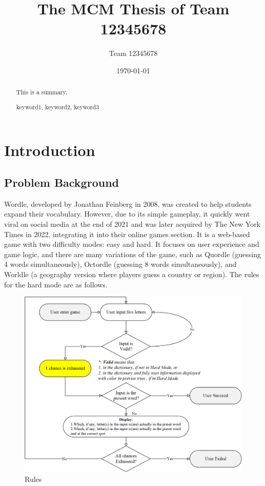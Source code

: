 \documentclass{mcmthesis}  %
\title{The MCM Thesis of Team 12345678}  %
\author{\small Team 12345678}  %
\date{\today}  %
\begin{document}
\begin{abstract}  %
This is a summary.
\begin{keywords}  %
keyword1, keyword2, keyword3
\end{keywords}  %
\end{abstract}  %
\maketitle  %

\tableofcontents  %


\newpage  %
\section{Introduction}  %

\subsection{Problem Background}

Wordle, developed by Jonathan Feinberg in 2008, was created 
to help students expand their vocabulary. However, due to its
simple gameplay, it quickly went viral on social media at the 
end of 2021 and was later acquired by The New York Times in 2022, 
integrating it into their online games section. It is a web-based 
game with two difficulty modes: easy and hard. It focuses on user 
experience and game logic, and there are many variations of the game, 
such as Quordle (guessing 4 words simultaneously), Octordle 
(guessing 8 words simultaneously), and Worldle (a geography version where 
players guess a country or region). The rules for the hard mode are as follows.

\begin{figure}[htbp]  %
\small
\centering  %
\includegraphics[width=14cm]{figure/2.png}  %
\caption{Rules} \label{Figure1}  %
\end{figure}  %
\end{document}
